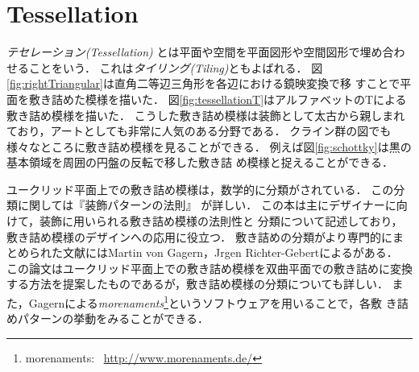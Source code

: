 
\section{Tessellation}

\emph{テセレーション}{\it (Tessellation)}
とは平面や空間を平面図形や空間図形で埋め合わせることをいう．
これは\emph{タイリング}{\it(Tiling)}ともよばれる．
図\ref{fig:rightTriangular}は直角二等辺三角形を各辺における鏡映変換で移
すことで平面を敷き詰めた模様を描いた．
図\ref{fig:tessellationT}はアルファベットのTによる敷き詰め模様を描いた．
こうした敷き詰め模様は装飾として太古から親しまれており，アートとしても非常に人気のある分野である．
クライン群の図でも様々なところに敷き詰め模様を見ることができる．
例えば図\ref{fig:schottky}は黒の基本領域を周囲の円盤の反転で移した敷き詰
め模様と捉えることができる．

ユークリッド平面上での敷き詰め模様は，数学的に分類がされている．
この分類に関しては『装飾パターンの法則』
\cite{fujitaｰ201507pattern}が詳しい．
この本は主にデザイナーに向けて，装飾に用いられる敷き詰め模様の法則性と
分類について記述しており，敷き詰め模様のデザインへの応用に役立つ．
敷き詰めの分類がより専門的にまとめられた文献にはMartin von Gagern，Jrgen
Richter-Gebertによる\cite{journals/combinatorics/GagernR09}がある．
この論文はユークリッド平面上での敷き詰め模様を双曲平面での敷き詰めに変換
する方法を提案したものであるが，敷き詰め模様の分類についても詳しい．
また，Gagernによる\emph{morenaments}\footnote{morenaments:~
\url{http://www.morenaments.de/}}というソフトウェアを用いることで，各敷
き詰めパターンの挙動をみることができる．

